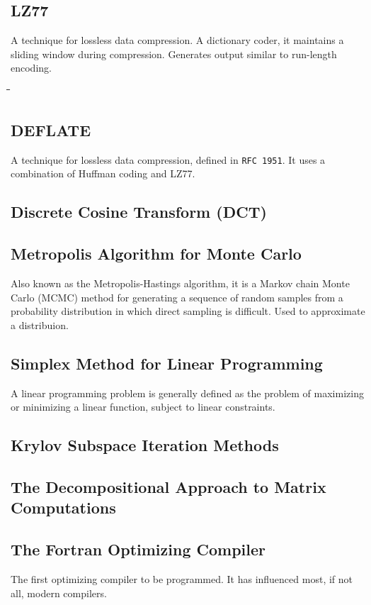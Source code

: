 \documentclass[10pt,letterpaper]{scrartcl}
\newcommand{\tabDef}{\hspace{2em}\=\hspace{2em}\=\hspace{2em}\=\hspace{2em}\=\kill}
\begin{document}
\subsection{LZ77}
A technique for lossless data compression. A dictionary coder, it maintains a sliding window during compression. Generates output similar to run-length encoding.
\begin{tabbing}\tabDef 
	
\end{tabbing}
\subsection{DEFLATE}
A technique for lossless data compression, defined in \texttt{RFC 1951}. It uses a combination of Huffman coding and LZ77. 

\subsection{Discrete Cosine Transform (DCT)}


\subsection{Metropolis Algorithm for Monte Carlo}
Also known as the Metropolis-Hastings algorithm, it is a Markov chain Monte Carlo (MCMC) method for generating a sequence of random samples from a probability distribution in which direct sampling is difficult. Used to approximate a distribuion. 

\subsection{Simplex Method for Linear Programming}
A linear programming problem is generally defined as the problem of maximizing or minimizing a linear function, subject to linear constraints.


\subsection{Krylov Subspace Iteration Methods}


\subsection{The Decompositional Approach to Matrix Computations}


\subsection{The Fortran Optimizing Compiler}
The first optimizing compiler to be programmed. It has influenced most, if not all, modern compilers.
\end{document}
